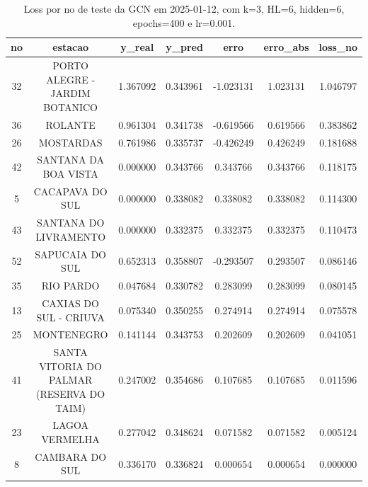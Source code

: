 \begin{table}[h]
\centering
\caption{Loss por no de teste da GCN em 2025-01-12, com k=3, HL=6, hidden=6, epochs=400 e lr=0.001.}
\label{tab:gcn_loss_k3_hl6_h6_e400_d20250112}
\begin{tabular}{ccccccc}
\toprule
no & estacao & y\_real & y\_pred & erro & erro\_abs & loss\_no \\
\midrule
32 & PORTO ALEGRE - JARDIM BOTANICO & 1.367092 & 0.343961 & -1.023131 & 1.023131 & 1.046797 \\
36 & ROLANTE & 0.961304 & 0.341738 & -0.619566 & 0.619566 & 0.383862 \\
26 & MOSTARDAS & 0.761986 & 0.335737 & -0.426249 & 0.426249 & 0.181688 \\
42 & SANTANA DA BOA VISTA & 0.000000 & 0.343766 & 0.343766 & 0.343766 & 0.118175 \\
5 & CACAPAVA DO SUL & 0.000000 & 0.338082 & 0.338082 & 0.338082 & 0.114300 \\
43 & SANTANA DO LIVRAMENTO & 0.000000 & 0.332375 & 0.332375 & 0.332375 & 0.110473 \\
52 & SAPUCAIA DO SUL & 0.652313 & 0.358807 & -0.293507 & 0.293507 & 0.086146 \\
35 & RIO PARDO & 0.047684 & 0.330782 & 0.283099 & 0.283099 & 0.080145 \\
13 & CAXIAS DO SUL - CRIUVA & 0.075340 & 0.350255 & 0.274914 & 0.274914 & 0.075578 \\
25 & MONTENEGRO & 0.141144 & 0.343753 & 0.202609 & 0.202609 & 0.041051 \\
41 & SANTA VITORIA DO PALMAR (RESERVA DO TAIM) & 0.247002 & 0.354686 & 0.107685 & 0.107685 & 0.011596 \\
23 & LAGOA VERMELHA & 0.277042 & 0.348624 & 0.071582 & 0.071582 & 0.005124 \\
8 & CAMBARA DO SUL & 0.336170 & 0.336824 & 0.000654 & 0.000654 & 0.000000 \\
\bottomrule
\end{tabular}
\end{table}
